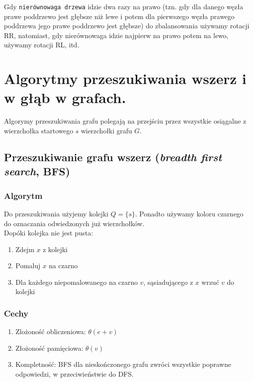 \documentclass[12pt]{article}
\begin{document}
    \noindent Gdy \texttt{nierównowaga drzewa} idzie dwa razy na prawo (tzn. gdy dla danego węzła prawe poddrzewo jest głębsze niż lewe i potem dla pierwszego węzła prawego poddrzewa jego prawe poddrzewo jest głębsze) do zbalansowania używamy rotacji RR, natomiast, gdy nierównowaga idzie najpierw na prawo potem na lewo, używamy rotacji RL, itd.

    \newpage

    \section{Algorytmy przeszukiwania wszerz i w głąb w grafach.}

    Algorymy przeszukiwania grafu polegają na przejściu przez wszystkie osiągalne z wierzchołka
    startowego $s$ wierzchołki grafu $G$.

    \subsection{Przeszukiwanie grafu wszerz (\textit{breadth first search}, BFS)}

    \subsubsection{Algorytm}

    Do przeszukiwania użyjemy kolejki $Q = \{s\}$. Ponadto używamy koloru czarnego do
    oznaczania odwiedzonych już wierzchołków.\[\]
    Dopóki kolejka nie jest pusta:
    \begin{enumerate}
        \item Zdejm $x$ z kolejki
        \item Pomaluj $x$ na czarno
        \item Dla każdego niepomalowanego na czarno $v$, sąsiadującego z $x$ wrzuć
        $v$ do kolejki
    \end{enumerate}

    \subsubsection{Cechy}

    \begin{enumerate}
        \item Zlożoność obliczeniowa: $\theta(e + v)$
        \item Złożoność pamięciowa: $\theta(v)$
        \item Kompletność: BFS dla nieskończonego grafu zwróci wszystkie poprawne
        odpowiedzi, w przeciwieństwie do DFS.
    \end{enumerate}
\end{document}
